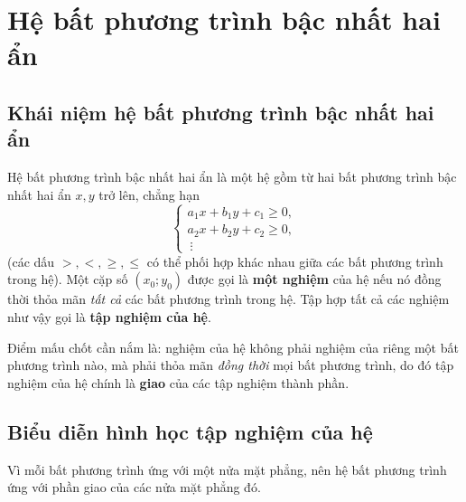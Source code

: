 \documentclass[12pt,a4paper]{report}
\begin{document}
\section{Hệ bất phương trình bậc nhất hai ẩn}
\label{sec:1.3}

\subsection{Khái niệm hệ bất phương trình bậc nhất hai ẩn}

\begin{definitionbox}
Hệ bất phương trình bậc nhất hai ẩn là một hệ gồm từ hai bất phương trình bậc nhất hai ẩn $x,y$ trở lên, chẳng hạn
\[
\begin{cases}
a_1x+b_1y+c_1 \ge 0,\\
a_2x+b_2y+c_2 \ge 0,\\
\ \vdots
\end{cases}
\]
(các dấu $>,<,\ge,\le$ có thể phối hợp khác nhau giữa các bất phương trình trong hệ). Một cặp số $(x_0;y_0)$ được gọi là \textbf{một nghiệm} của hệ nếu nó đồng thời thỏa mãn \emph{tất cả} các bất phương trình trong hệ. Tập hợp tất cả các nghiệm như vậy gọi là \textbf{tập nghiệm của hệ}.
\end{definitionbox}

Điểm mấu chốt cần nắm là: nghiệm của hệ không phải nghiệm của riêng một bất phương trình nào, mà phải thỏa mãn \emph{đồng thời} mọi bất phương trình, do đó tập nghiệm của hệ chính là \textbf{giao} của các tập nghiệm thành phần.

\subsection{Biểu diễn hình học tập nghiệm của hệ}

Vì mỗi bất phương trình ứng với một nửa mặt phẳng, nên hệ bất phương trình ứng với phần giao của các nửa mặt phẳng đó.
\end{document}
